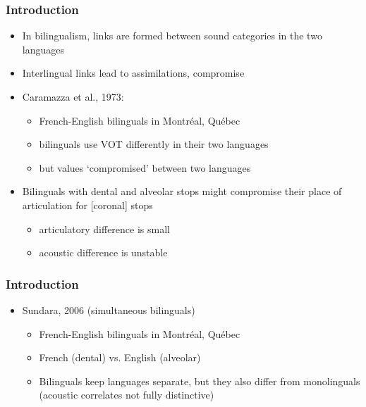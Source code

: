 \documentclass{beamer}
\begin{document}
\begin{frame}
\frametitle{Introduction}
\begin{itemize}
	\item In bilingualism, links are formed between sound categories in the two languages
	\item Interlingual links lead to assimilations, compromise
	\item Caramazza et al., 1973:
	\begin{itemize}
		\item French-English bilinguals in Montr\'{e}al, Qu\'{e}bec
		\item bilinguals use VOT differently in their two languages
		\item but values `compromised' between two languages
	\end{itemize}
	\item \alert{Bilinguals with dental and alveolar stops might compromise their place of articulation for [coronal] stops}
	\begin{itemize}
		\item articulatory difference is small
		\item acoustic difference is unstable
	\end{itemize}
\end{itemize}
\end{frame}

\begin{frame}
\frametitle{Introduction}
\begin{itemize}
	\item Sundara, 2006 (simultaneous bilinguals)
	\begin{itemize}
		\item French-English bilinguals in Montr\'{e}al, Qu\'{e}bec
		\item French  (dental) vs. English  (alveolar)
		\item Bilinguals keep languages separate, but they also differ from monolinguals (acoustic correlates not fully distinctive)
	\end{itemize}

\end{itemize}
\end{frame}
\end{document}
